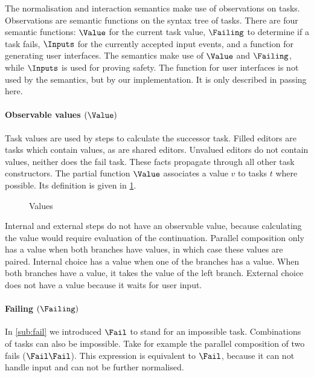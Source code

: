 The normalisation and interaction semantics make use of observations on tasks.
Observations are semantic functions on the syntax tree of tasks.
There are four semantic functions: $\Value$ for the current task value, $\Failing$ to determine if a task fails, $\Inputs$ for the currently accepted input events, and a function for generating user interfaces.
The semantics make use of $\Value$ and $\Failing$, while $\Inputs$ is used for proving safety.
The function for user interfaces is not used by the semantics, but by our implementation.
It is only described in passing here.




\paragraph{Observable values $(\Value)$}

Task values are used by steps to calculate the successor task.
Filled editors are tasks which contain values, as are shared editors.
Unvalued editors do not contain values, neither does the fail task.
These facts propagate through all other task constructors.
The partial function $\Value$ associates a value $v$ to tasks $t$ where possible.
Its definition is given in \cref{fig:observation-value}.

\begin{figure}[h]
  \small
  \caption{Values} \label{fig:observation-value}
\end{figure}

Internal and external steps do not have an observable value, because calculating the value would require evaluation of the continuation.
Parallel composition only has a value when both branches have values, in which case these values are paired.
Internal choice has a value when one of the branches has a value.
When both branches have a value, it takes the value of the left branch.
External choice does not have a value because it waits for user input.



\paragraph{Failing $(\Failing)$}

In \cref{sub:fail} we introduced $\Fail$ to stand for an impossible task.
Combinations of tasks can also be impossible.
Take for example the parallel composition of two fails ($\Fail \And \Fail$).
This expression is equivalent to $\Fail$, because it can not handle input and can not be further normalised.

